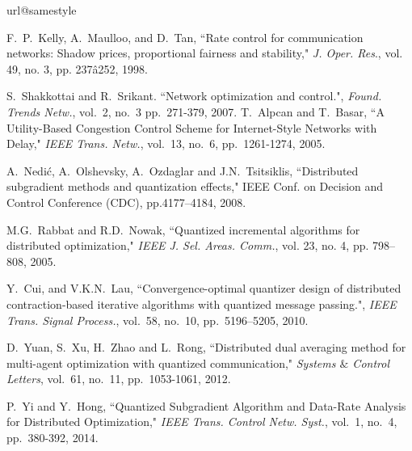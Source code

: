 \documentclass[10pt,twocolumn,twoside]{IEEEtran}
\begin{document}
\begin{thebibliography}{1}
\providecommand{\url}[1]{#1}
\csname url@samestyle\endcsname
\providecommand{\newblock}{\relax}
\providecommand{\bibinfo}[2]{#2}
\providecommand{\BIBentrySTDinterwordspacing}{\spaceskip=0pt\relax}
\providecommand{\BIBentryALTinterwordstretchfactor}{4}
\providecommand{\BIBentryALTinterwordspacing}{\spaceskip=\fontdimen2\font plus
\BIBentryALTinterwordstretchfactor\fontdimen3\font minus
  \fontdimen4\font\relax}
\providecommand{\BIBforeignlanguage}[2]{{\expandafter\ifx\csname l@#1\endcsname\relax
\typeout{** WARNING: IEEEtran.bst: No hyphenation pattern has been}\typeout{** loaded for the language `#1'. Using the pattern for}\typeout{** the default language instead.}\else
\language=\csname l@#1\endcsname
\fi
#2}}
\providecommand{\BIBdecl}{\relax}

\BIBdecl
{}
F.~P.~Kelly, A.~Maulloo, and D.~Tan, ``Rate control for communication
networks: Shadow prices, proportional fairness and stability," \emph{J. Oper. Res}., vol. 49, no. 3, pp. 237â252,  1998.

S.~Shakkottai and R.~Srikant. ``Network optimization and control.", \emph{Found. Trends Netw.}, vol.~2, no.~3 pp.~271-379, 2007.
T.~Alpcan and T.~Basar, ``A Utility-Based Congestion Control Scheme for Internet-Style Networks with Delay," \emph{IEEE Trans. Netw.}, vol.~13, no.~6, pp.~1261-1274,  2005.

A.~Nedi\'{c}, A.~Olshevsky, A.~Ozdaglar and J.N.~Tsitsiklis, ``Distributed subgradient methods and quantization effects," IEEE Conf. on Decision and Control Conference (CDC), pp.4177--4184,  2008.

M.G.~Rabbat and R.D.~Nowak, ``Quantized incremental algorithms for distributed optimization," \emph{IEEE J. Sel. Areas. Comm.}, vol. 23, no. 4, pp. 798--808,  2005.

Y.~Cui, and V.K.N.~Lau, ``Convergence-optimal quantizer design of distributed contraction-based iterative algorithms with quantized message passing.", \emph{IEEE Trans. Signal Process.}, vol.~58, no.~10, pp.~5196--5205,  2010.

D.~Yuan, S.~Xu, H.~Zhao and L.~Rong, ``Distributed dual averaging method for multi-agent optimization with quantized communication," \emph{Systems $\&$ Control Letters}, vol.~61, no.~11, pp.~1053-1061,  2012.

P.~Yi and Y.~Hong, ``Quantized Subgradient Algorithm and Data-Rate Analysis for Distributed Optimization," \emph{IEEE Trans. Control Netw. Syst.}, vol.~1, no.~4, pp.~380-392,  2014.


\end{thebibliography}
\end{document}
